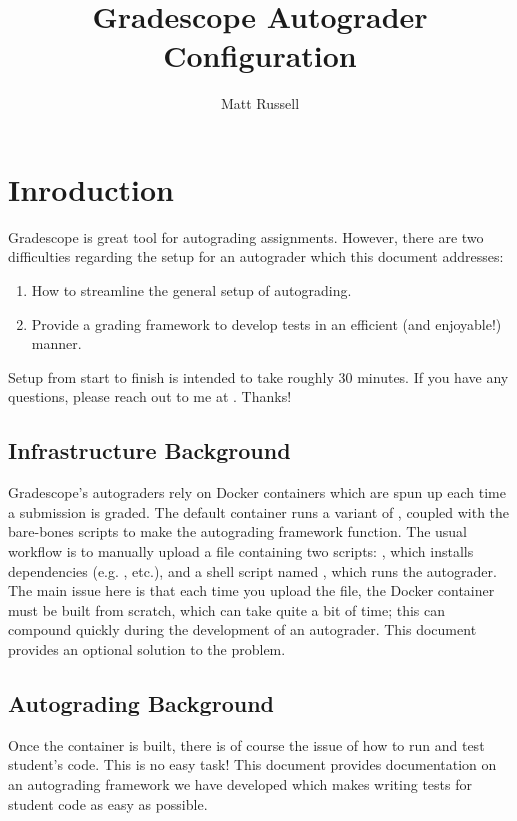 \documentclass[11pt]{report}
\author{Matt Russell}
\title{Gradescope Autograder Configuration}
\begin{document}
\maketitle

\chapter*{Inroduction}
Gradescope is great tool for autograding assignments. However, there are two difficulties  
regarding the setup for an autograder which this document addresses:
\begin{enumerate}
      \item How to streamline the general setup of autograding.
      \item Provide a grading framework to develop tests in an efficient (and enjoyable!) manner.
\end{enumerate}
Setup from start to finish is intended to take roughly 30 minutes. If you have any questions, please reach out 
to me at . Thanks!

\section*{Infrastructure Background}
Gradescope's autograders rely on Docker containers which are spun up each time 
a submission is graded. The default container runs a variant of ,
coupled with the bare-bones scripts to make the autograding framework function. The usual 
workflow is to manually upload a  file containing two scripts: 
, which installs dependencies (e.g. , etc.), and a shell script 
named , which runs the autograder. The main issue here is that each time you 
upload the  file, the Docker container must be built from scratch, which can take quite
a bit of time; this can compound quickly during the development of an autograder. This document 
provides an optional solution to the problem. 

\section*{Autograding Background}
Once the container is built, there is of course the issue of how to run and test student's code. 
This is no easy task! This document provides documentation on an autograding framework we have 
developed which makes writing tests for student code as easy as possible. 
\end{document}
